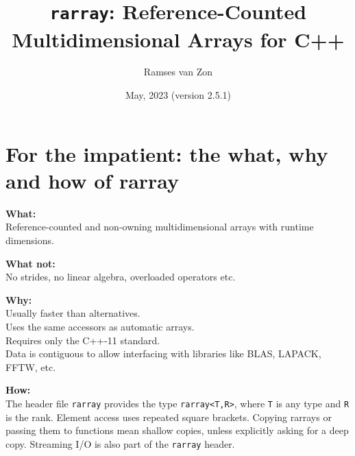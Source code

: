 \documentclass[11pt,twoside]{article}
\newcommand{\cxx}{C{++}}
\begin{document}
\setlength{\parskip}{1mm}

\title{\texttt{rarray}: Reference-Counted Multidimensional Arrays for \cxx}

\author{Ramses van Zon%
\vspace{-8pt}} 

\date{May, 2023 (version 2.5.1)\vspace{-7mm}}

\maketitle

\section{For the impatient: the what, why and how of rarray}

\noindent\textbf{What:}\\
Reference-counted and non-owning multidimensional arrays with runtime dimensions. 

\noindent\textbf{What not:}\\
No strides, no linear algebra, overloaded operators etc.

\noindent\textbf{Why:}\\
Usually faster than alternatives.\\
Uses the same accessors as automatic arrays.\\
Requires only the C++-11 standard.\\
Data is contiguous to allow interfacing with
libraries like BLAS, LAPACK, FFTW, etc.

\noindent\textbf{How:}\\
The header file \texttt{rarray} provides the type \texttt{rarray<T,R>}, where \texttt{T} is any type and {\tt R} is the rank. Element access uses repeated square brackets. Copying rarrays or passing them to functions mean shallow copies, unless explicitly asking for a deep copy. Streaming I/O is also part of the \texttt{rarray} header.

\
\end{document}
